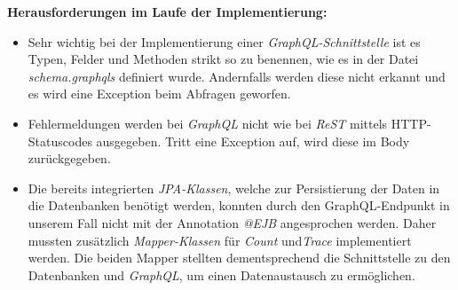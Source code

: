 \documentclass[10pt,journal,compsoc]{IEEEtran}
\begin{document}
\textbf{Herausforderungen im Laufe der Implementierung:}
\begin{itemize}
	\item Sehr wichtig bei der Implementierung einer \textit{GraphQL-Schnittstelle} ist es Typen, Felder und Methoden strikt so zu benennen, wie es in der Datei \textit{schema.graphqls} definiert wurde. Andernfalls werden diese nicht erkannt und es wird eine Exception beim Abfragen geworfen. 
\end{itemize}
\begin{itemize}
	\item Fehlermeldungen werden bei \textit{GraphQL} nicht wie bei \textit{ReST} mittels HTTP-Statuscodes ausgegeben. Tritt eine Exception auf, wird diese im Body zurückgegeben.  
\end{itemize}
\begin{itemize}
	\item Die bereits integrierten \textit{JPA-Klassen}, welche zur Persistierung der Daten in die Datenbanken benötigt werden, konnten durch den GraphQL-Endpunkt in unserem Fall nicht mit der Annotation \textit{@EJB} angesprochen werden. Daher mussten zusätzlich \textit{Mapper-Klassen} für \textit{Count} und\textit{Trace} implementiert werden. Die beiden Mapper stellten dementsprechend die Schnittstelle zu den Datenbanken und  \textit{GraphQL}, um einen Datenaustausch zu ermöglichen.
\end{itemize}
\end{document}
